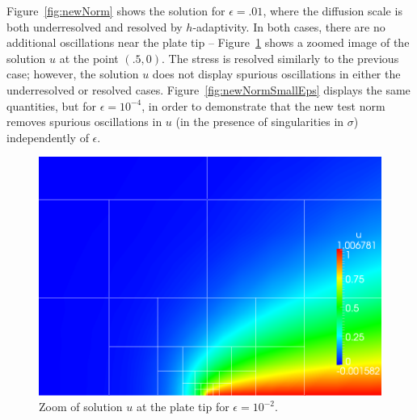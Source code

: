 \documentclass[letterpaper]{article}
\begin{document}
Figure~\ref{fig:newNorm} shows the solution for $\epsilon = .01$, where the
diffusion scale is both underresolved and resolved by $h$-adaptivity.  In both
cases, there are no additional oscillations near the plate tip --
Figure~\ref{fig:newNormZoom} shows a zoomed image of the solution $u$ at the
point $(.5,0)$.  The stress is resolved similarly to the previous case;
however, the solution $u$ does not display spurious oscillations in either the
underresolved or resolved cases.  Figure~\ref{fig:newNormSmallEps} displays
the same quantities, but for $\epsilon = 10^{-4}$, in order to demonstrate
that the new test norm removes spurious oscillations in $u$ (in the presence
of singularities in $\sigma$) independently of $\epsilon$.  

\begin{figure}[!h]
\centering
\includegraphics[scale=.3]{figs/LaplaceFigs/coupled1e2h1e3uZoom.png}
\caption{Zoom of solution $u$ at the plate tip for $\epsilon = 10^{-2}$.}
\label{fig:newNormZoom}
\end{figure}
\end{document}
